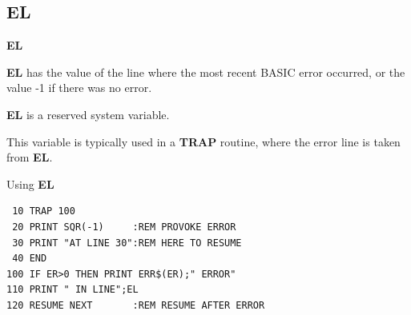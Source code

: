 \subsection{EL}
\begin{description}[leftmargin=2cm,style=nextline]
\item [Format:] {\bf EL}
\item [Usage:]  {\bf EL} has the value of the line where
               the most recent BASIC error occurred,
                or the value -1 if there was no error.
\item [Remarks:] {\bf EL} is a reserved system variable.

This variable is typically used in a {\bf TRAP} routine,
where the error line is taken from {\bf EL}.

\item [Example:] Using {\bf EL}
\begin{tcolorbox}[colback=black,coltext=white]
\verbatimfont{\codefont}
\begin{verbatim}
 10 TRAP 100
 20 PRINT SQR(-1)     :REM PROVOKE ERROR
 30 PRINT "AT LINE 30":REM HERE TO RESUME
 40 END
100 IF ER>0 THEN PRINT ERR$(ER);" ERROR"
110 PRINT " IN LINE";EL
120 RESUME NEXT       :REM RESUME AFTER ERROR
\end{verbatim}
\end{tcolorbox}
\end{description}


\newpage
